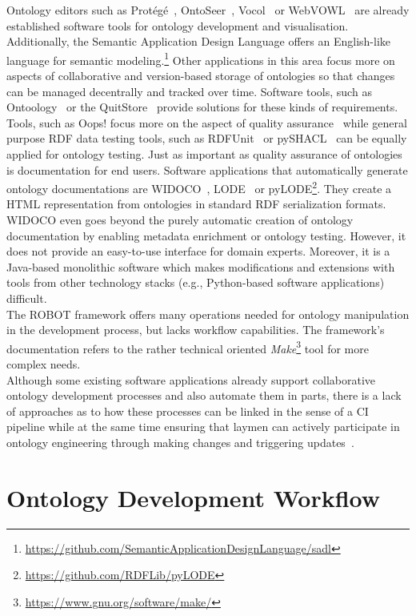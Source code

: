 \documentclass[runningheads]{llncs}
\begin{document}
Ontology editors such as Protégé~\cite{protege}, OntoSeer~\cite{ontoseer}, Vocol~\cite{halilaj} or WebVOWL~\cite{lohmann} are already established software tools for ontology development and visualisation. Additionally, the Semantic Application Design Language offers an English-like language for semantic modeling.\footnote{\url{https://github.com/SemanticApplicationDesignLanguage/sadl}} Other applications in this area focus more on aspects of collaborative and version-based storage of ontologies so that changes can be managed decentrally and tracked over time. Software tools, such as Ontoology~\cite{alobaid} or the QuitStore~\cite{arndt} provide solutions for these kinds of requirements.\\
Tools, such as Oops! focus more on the aspect of quality assurance~\cite{poveda} while general purpose RDF data testing tools, such as RDFUnit~\cite{rdfunit} or pySHACL~\cite{sommer} can be equally applied for ontology testing. Just as important as quality assurance of ontologies is documentation for end users. Software applications that automatically generate ontology documentations are WIDOCO~\cite{widoco}, LODE~\cite{lode} or pyLODE\footnote{\url{https://github.com/RDFLib/pyLODE}}. They create a HTML representation from ontologies in standard RDF serialization formats. WIDOCO even goes beyond the purely automatic creation of ontology documentation by enabling metadata enrichment or ontology testing. However, it does not provide an easy-to-use interface for domain experts. Moreover, it is a Java-based monolithic software which makes modifications and extensions with tools from other technology stacks (e.g., Python-based software applications) difficult.\\
The ROBOT framework offers many operations needed for ontology manipulation in the development process, but lacks workflow capabilities. The framework's documentation refers to the rather technical oriented \textit{Make}\footnote{\url{https://www.gnu.org/software/make/}} tool for more complex needs.\\
Although some existing software applications already support collaborative ontology development processes and also automate them in parts, there is a lack of approaches as to how these processes can be linked in the sense of a CI pipeline while at the same time ensuring that laymen can actively participate in ontology engineering through making changes and triggering updates~\cite{mungall}.
\section{Ontology Development Workflow}\label{sec:ontoflow}
\end{document}
